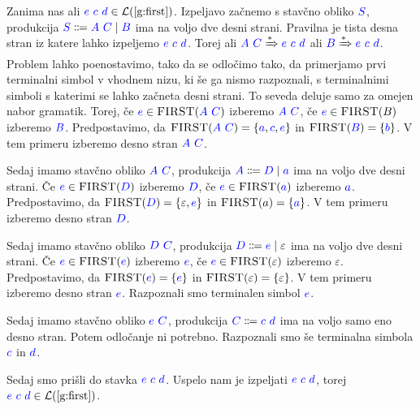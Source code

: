 \documentclass{article}
\newcommand{\FIRST}{\textsc{FIRST}}
\newcommand{\Symbol}[1]{\textcolor{blue}{#1}}
\newcommand{\Null}{\varepsilon}
\newcommand{\Language}[1]{\mathcal{L}(#1)}
\newcommand{\Arrow}{\Coloneqq}
\newcommand{\DeriveStar}{\xRightarrow{\ast}}
\newcommand{\Seq}{\ }
\newcommand{\Union}{\mathrel{|}}
\begin{document}
Zanima nas ali $\Symbol{e} \Seq \Symbol{c} \Seq \Symbol{d} \in \Language{\text{\ref{g:first}}}$.
Izpeljavo začnemo s stavčno obliko $\Symbol{S}$, produkcija $\Symbol{S} \Arrow \Symbol{A} \Seq \Symbol{C} \Union \Symbol{B}$ ima na voljo dve desni strani.
Pravilna je tista desna stran iz katere lahko izpeljemo $\Symbol{e} \Seq \Symbol{c} \Seq \Symbol{d}$.
Torej ali $\Symbol{A} \Seq \Symbol{C} \DeriveStar \Symbol{e} \Seq \Symbol{c} \Seq \Symbol{d}$ ali $\Symbol{B} \DeriveStar \Symbol{e} \Seq \Symbol{c} \Seq \Symbol{d}$.
Problem lahko poenostavimo, tako da se odločimo tako, da primerjamo prvi terminalni simbol v vhodnem nizu, ki še ga nismo razpoznali, s terminalnimi simboli s katerimi se lahko začneta desni strani.
To seveda deluje samo za omejen nabor gramatik.
Torej, če $\Symbol{e} \in \FIRST(\Symbol{A} \Seq \Symbol{C})$ izberemo $\Symbol{A} \Seq \Symbol{C}$, če $\Symbol{e} \in \FIRST(B)$ izberemo $\Symbol{B}$.
Predpostavimo, da $\FIRST(\Symbol{A} \Seq \Symbol{C}) = \{\Symbol{a}, \Symbol{c}, \Symbol{e}\}$ in $\FIRST(\Symbol{B}) = \{\Symbol{b}\}$.
V tem primeru izberemo desno stran $\Symbol{A} \Seq \Symbol{C}$.

Sedaj imamo stavčno obliko $\Symbol{A} \Seq \Symbol{C}$, produkcija $\Symbol{A} \Arrow \Symbol{D} \Union \Symbol{a}$ ima na voljo dve desni strani.
Če $\Symbol{e} \in \FIRST(\Symbol{D})$ izberemo $\Symbol{D}$, če $\Symbol{e} \in \FIRST(\Symbol{a})$ izberemo $\Symbol{a}$.
Predpostavimo, da $\FIRST(\Symbol{D}) = \{\Null, \Symbol{e}\}$ in $\FIRST(a) = \{\Symbol{a}\}$.
V tem primeru izberemo desno stran $\Symbol{D}$.

Sedaj imamo stavčno obliko $\Symbol{D} \Seq \Symbol{C}$, produkcija $\Symbol{D} \Arrow \Symbol{e} \Union \Null$ ima na voljo dve desni strani.
Če $\Symbol{e} \in \FIRST(\Symbol{e})$ izberemo $\Symbol{e}$, če $\Symbol{e} \in \FIRST(\Null)$ izberemo $\Null$.
Predpostavimo, da $\FIRST(\Symbol{e}) = \{\Symbol{e}\}$ in $\FIRST(\Null) = \{\Null\}$.
V tem primeru izberemo desno stran $\Symbol{e}$.
Razpoznali smo terminalen simbol $\Symbol{e}$.

Sedaj imamo stavčno obliko $\Symbol{e} \Seq \Symbol{C}$, produkcija $\Symbol{C} \Arrow \Symbol{c} \Seq \Symbol{d}$ ima na voljo samo eno desno stran.
Potem odločanje ni potrebno.
Razpoznali smo še terminalna simbola $\Symbol{c}$ in $\Symbol{d}$.

Sedaj smo prišli do stavka $\Symbol{e} \Seq \Symbol{c} \Seq \Symbol{d}$.
Uspelo nam je izpeljati $\Symbol{e} \Seq \Symbol{c} \Seq \Symbol{d}$, torej ${\Symbol{e} \Seq \Symbol{c} \Seq \Symbol{d} \in \Language{\text{\ref{g:first}}}}$.
\end{document}
